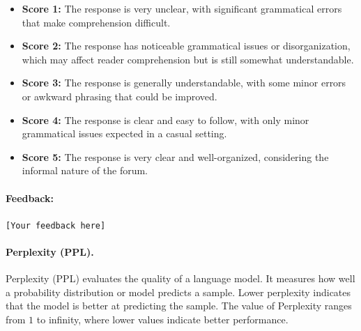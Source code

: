 \begin{breakablefigure}
\begin{tcolorbox}[
  enhanced,
  breakable,
  colback=gray!10,
  colframe=black,
  title=Fluency Evaluation,
  fontupper=\small
]
\begin{itemize}
    \item \textbf{Score 1:} The response is very unclear, with significant grammatical errors that make comprehension difficult.
    \item \textbf{Score 2:} The response has noticeable grammatical issues or disorganization, which may affect reader comprehension but is still somewhat understandable.
    \item \textbf{Score 3:} The response is generally understandable, with some minor errors or awkward phrasing that could be improved.
    \item \textbf{Score 4:} The response is clear and easy to follow, with only minor grammatical issues expected in a casual setting.
    \item \textbf{Score 5:} The response is very clear and well-organized, considering the informal nature of the forum.
\end{itemize}

\paragraph{Feedback:}
\texttt{[Your feedback here]}

\end{tcolorbox}
\label{fig:app-cpfuse-rubric}
\end{breakablefigure}

\FloatBarrier

\paragraph{Perplexity (PPL).}
Perplexity (PPL) evaluates the quality of a language model. It measures how well a probability distribution or model predicts a sample. Lower perplexity indicates that the model is better at predicting the sample. The value of Perplexity ranges from \(1\) to infinity, where lower values indicate better performance.
